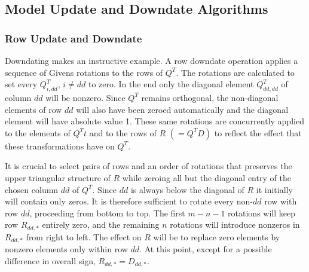 \subsection{Model Update and Downdate Algorithms}

\subsubsection{Row Update and Downdate}

Downdating makes an instructive example. A row downdate operation applies
a sequence of Givens rotations to the rows of $Q^T$.
The rotations are calculated to set every $Q^T_{i,dd}$, $i \neq dd$ to zero.
In the end only the diagonal element $Q^T_{dd,dd}$ of column $dd$ will be nonzero.
Since $Q^T$ remains orthogonal, the non-diagonal elements of row $dd$ will also have been zeroed automatically
and the diagonal element will have absolute value 1.
These same rotations are concurrently applied to the elements of $Q^T t$ and to the rows of $R$ $(= Q^T D)$
to reflect the effect that these transformations have on $Q^T$.

It is crucial to select pairs of rows and an order of rotations that preserves the upper triangular structure of $R$
while zeroing all but the diagonal entry of the chosen column $dd$ of $Q^T$.
Since $dd$ is always below the diagonal of $R$ it initially will contain only zeros.
It is therefore sufficient to rotate every non-$dd$ row with row $dd$, proceeding from bottom to top.
The first $m - n - 1$ rotations will keep row $R_{dd,*}$ entirely zero,
and the remaining $n$ rotations will introduce nonzeros in $R_{dd,*}$ from right to left.
The effect on $R$ will be to replace zero elements by nonzero elements only within row $dd$.
At this point, except for a possible difference in overall sign, $R_{dd,*} = D_{dd,*}$.

